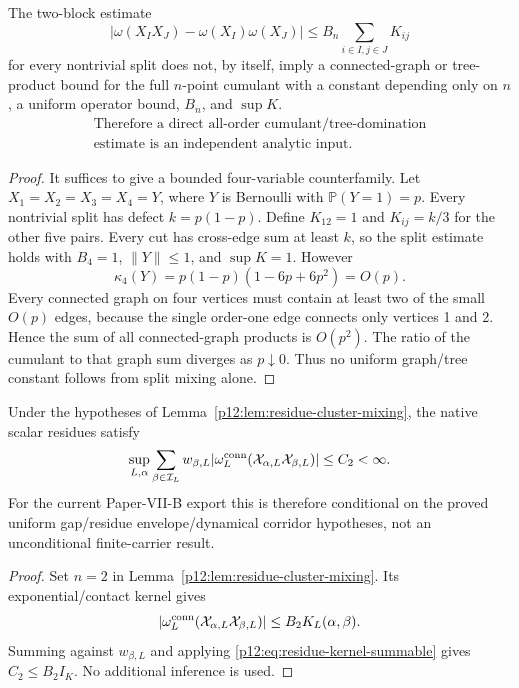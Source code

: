 \documentclass[12pt,a4paper]{article}
\begin{document}
\begin{lemma}
\label{p12:lem:finite-cumulant-connectivity}
The two-block estimate
\[
|\omega(X_IX_J)-\omega(X_I)\omega(X_J)|
\le B_n\sum_{i\in I,j\in J}K_{ij}
\]
for every nontrivial split does not, by itself, imply a connected-graph or tree-product bound for the full \(n\)-point cumulant with a constant depending only on \(n\), a uniform operator bound, \(B_n\), and \(\sup K\).
\begin{equation}
\label{p12:eq:finite-cumulant-connectivity}
\begin{gathered}
\text{Therefore a direct all-order cumulant/tree-domination}\\
\text{estimate is an independent analytic input.}
\end{gathered}
\end{equation}
\end{lemma}
\begin{proof}
It suffices to give a bounded four-variable counterfamily.  Let \(X_1=X_2=X_3=X_4=Y\), where \(Y\) is Bernoulli with \(\mathbb P(Y=1)=p\).  Every nontrivial split has defect \(k=p(1-p)\).  Define \(K_{12}=1\) and \(K_{ij}=k/3\) for the other five pairs.  Every cut has cross-edge sum at least \(k\), so the split estimate holds with \(B_4=1\), \(\|Y\|\le1\), and \(\sup K=1\).  However
\[
\kappa_4(Y)=p(1-p)(1-6p+6p^2)=O(p).
\]
Every connected graph on four vertices must contain at least two of the small \(O(p)\) edges, because the single order-one edge connects only vertices 1 and 2.  Hence the sum of all connected-graph products is \(O(p^2)\).  The ratio of the cumulant to that graph sum diverges as \(p\downarrow0\).  Thus no uniform graph/tree constant follows from split mixing alone.
\end{proof}

\begin{lemma}
\label{p12:lem:ucs-two-point-susceptibility}
Under the hypotheses of Lemma~\ref{p12:lem:residue-cluster-mixing}, the native scalar residues satisfy
\begin{equation}
\label{p12:eq:ucs-two-point-susceptibility}
\sup_{L,\alpha}\sum_{\beta\in\mathcal I_L}w_{\beta,L}
|\omega_L^{\rm conn}(\mathcal X_{\alpha,L}\mathcal X_{\beta,L})|
\le C_2<\infty.
\end{equation}
For the current Paper-VII-B export this is therefore conditional on the proved uniform gap/residue envelope/dynamical corridor hypotheses, not an unconditional finite-carrier result.
\end{lemma}
\begin{proof}
Set \(n=2\) in Lemma~\ref{p12:lem:residue-cluster-mixing}.  Its exponential/contact kernel gives
\[
|\omega_L^{\rm conn}(\mathcal X_{\alpha,L}\mathcal X_{\beta,L})|
\le B_2K_L(\alpha,\beta).
\]
Summing against \(w_{\beta,L}\) and applying \eqref{p12:eq:residue-kernel-summable} gives \(C_2\le B_2I_K\).  No additional inference is used.
\end{proof}
\end{document}
